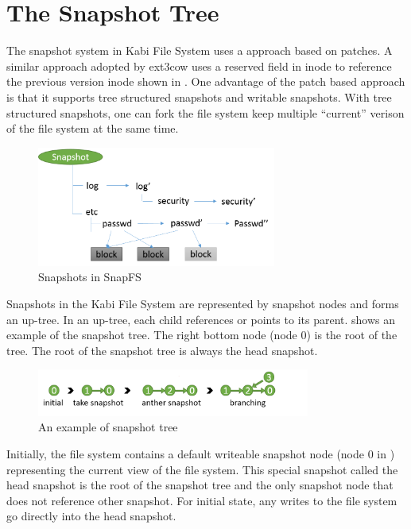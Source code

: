 \section{The Snapshot Tree}

    The snapshot system in Kabi File System uses a approach based on patches. A similar approach adopted by ext3cow uses a reserved field in inode to reference the previous version inode shown in . One advantage of the patch based approach is that it supports tree structured snapshots and writable snapshots. With tree structured snapshots, one can fork the file system keep multiple ``current'' verison of the file system at the same time.

\begin{figure}[t]
\centering
\includegraphics[width=0.7\textwidth]{Chapter-4/figs/fig24.png}
\caption{Snapshots in SnapFS}
\label{fig:snapfs_approach}
\end{figure}

    Snapshots in the Kabi File System are represented by snapshot nodes and forms an up-tree. In an up-tree, each child references or points to its parent.  shows an example of the snapshot tree. The right bottom node (node 0) is the root of the tree. The root of the snapshot tree is always the head snapshot.

\begin{figure}[t]
\centering
\includegraphics[width=0.8\textwidth]{Chapter-4/figs/fig13.png}
\caption{An example of snapshot tree}
\label{fig:snap_tree_example}
\end{figure}

    Initially, the file system contains a default writeable snapshot node (node 0 in ) representing the current view of the file system. This special snapshot called the head snapshot is the root of the snapshot tree and the only snapshot node that does not reference other snapshot. For initial state, any writes to the file system go directly into the head snapshot.
    
